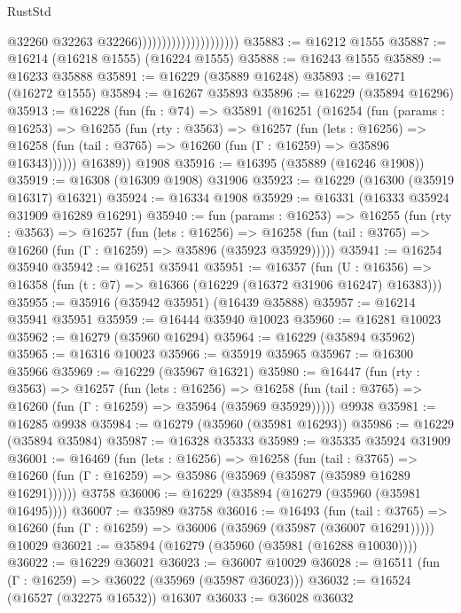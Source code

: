 \begin{lexlean}{RustStd}
\begin{coremodule}
                                              @32260
                                              @32263
                                              @32266)))))))))))))))))))))
@35883 := @16212 @1555
@35887 := @16214 (@16218 @1555) (@16224 @1555)
@35888 := @16243 @1555
@35889 := @16233 @35888
@35891 := @16229 (@35889 @16248)
@35893 := @16271 (@16272 @1555)
@35894 := @16267 @35893
@35896 := @16229 (@35894 @16296)
@35913 := @16228
    (fun (fn : @74) =>
    @35891
      (@16251
        (@16254
          (fun (params : @16253) =>
          @16255
            (fun (rty : @3563) =>
            @16257
              (fun (lets : @16256) =>
              @16258 (fun (tail : @3765) => @16260 (fun (Γ : @16259) => @35896 @16343))))))
        @16389))
    @1908
@35916 := @16395 (@35889 (@16246 @1908))
@35919 := @16308 (@16309 @1908) @31906
@35923 := @16229 (@16300 (@35919 @16317) @16321)
@35924 := @16334 @1908
@35929 := @16331 (@16333 @35924 @31909 @16289 @16291)
@35940 := fun (params : @16253) =>
  @16255
    (fun (rty : @3563) =>
    @16257
      (fun (lets : @16256) =>
      @16258 (fun (tail : @3765) => @16260 (fun (Γ : @16259) => @35896 (@35923 @35929)))))
@35941 := @16254 @35940
@35942 := @16251 @35941
@35951 := @16357
    (fun (U : @16356) => @16358 (fun (t : @7) => @16366 (@16229 (@16372 @31906 @16247) @16383)))
@35955 := @35916 (@35942 @35951) (@16439 @35888)
@35957 := @16214 @35941 @35951
@35959 := @16444 @35940 @10023
@35960 := @16281 @10023
@35962 := @16279 (@35960 @16294)
@35964 := @16229 (@35894 @35962)
@35965 := @16316 @10023
@35966 := @35919 @35965
@35967 := @16300 @35966
@35969 := @16229 (@35967 @16321)
@35980 := @16447
    (fun (rty : @3563) =>
    @16257
      (fun (lets : @16256) =>
      @16258 (fun (tail : @3765) => @16260 (fun (Γ : @16259) => @35964 (@35969 @35929)))))
    @9938
@35981 := @16285 @9938
@35984 := @16279 (@35960 (@35981 @16293))
@35986 := @16229 (@35894 @35984)
@35987 := @16328 @35333
@35989 := @35335 @35924 @31909
@36001 := @16469
    (fun (lets : @16256) =>
    @16258
      (fun (tail : @3765) =>
      @16260 (fun (Γ : @16259) => @35986 (@35969 (@35987 (@35989 @16289 @16291))))))
    @3758
@36006 := @16229 (@35894 (@16279 (@35960 (@35981 @16495))))
@36007 := @35989 @3758
@36016 := @16493
    (fun (tail : @3765) => @16260 (fun (Γ : @16259) => @36006 (@35969 (@35987 (@36007 @16291)))))
    @10029
@36021 := @35894 (@16279 (@35960 (@35981 (@16288 @10030))))
@36022 := @16229 @36021
@36023 := @36007 @10029
@36028 := @16511 (fun (Γ : @16259) => @36022 (@35969 (@35987 @36023)))
@36032 := @16524 (@16527 (@32275 @16532)) @16307
@36033 := @36028 @36032

\end{coremodule}
\end{lexlean}
